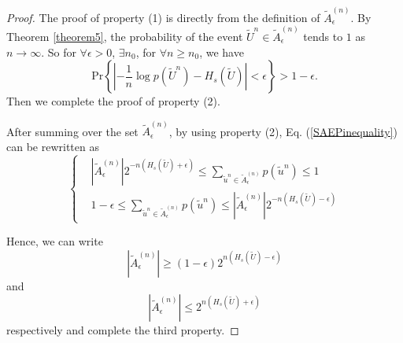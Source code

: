 \documentclass[12pt, draftclsnofoot,onecolumn]{IEEEtran}
\begin{document}
\begin{proof}
The proof of property (1) is directly from the definition of $\tilde{A}_{\epsilon}^{(n)}$. By Theorem \ref{theorem5}, the probability of the event $\tilde{U}^n \in \tilde{A}_{\epsilon}^{(n)}$ tends to $1$ as $n\to \infty$. So for $\forall \epsilon>0$, $\exists n_0$, for $\forall n \geq n_0$, we have
\begin{equation}
\text{Pr}\left\{ \left|-\frac{1}{n}\log p(\tilde{U}^n)-H_s(\tilde{U})\right|<\epsilon\right\}>1-\epsilon.
\end{equation}
Then we complete the proof of property (2).

After summing over the set $\tilde{A}_{\epsilon}^{(n)}$, by using property (2), Eq. (\ref{SAEPinequality}) can be rewritten as
\begin{equation}
\left\{ \begin{aligned}
&\left|\tilde{A}_{\epsilon}^{(n)}\right| 2^{-n\left(H_s(\tilde{U})+\epsilon\right)}\leq \sum_{\tilde{u}^n\in \tilde{A}_{\epsilon}^{(n)}} p\left(\tilde{u}^n\right)\leq 1\\
&1-\epsilon \leq \sum_{\tilde{u}^n\in \tilde{A}_{\epsilon}^{(n)}} p\left(\tilde{u}^n\right) \leq \left|\tilde{A}_{\epsilon}^{(n)}\right| 2^{-n\left(H_s(\tilde{U})-\epsilon\right)}
\end{aligned}\right.
\end{equation}

Hence, we can write
\begin{equation}\label{equation61}
\left|\tilde{A}_{\epsilon}^{(n)}\right| \geq \left(1-\epsilon\right) 2^{n\left(H_s(\tilde{U})-\epsilon\right)}
\end{equation}
and
\begin{equation}\label{equation62}
\left|\tilde{A}_{\epsilon}^{(n)}\right| \leq 2^{n\left(H_s(\tilde{U})+\epsilon\right)}
\end{equation}
respectively and complete the third property.
\end{proof}
\end{document}
